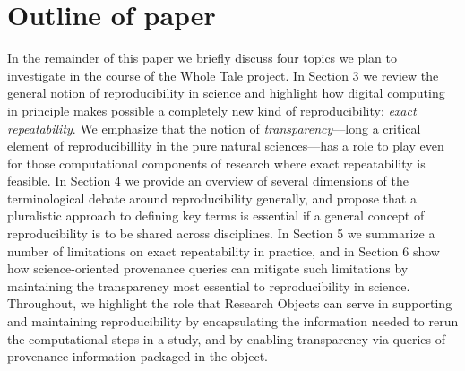 \section{Outline of paper}
In the remainder of this paper we briefly discuss four topics we plan to investigate
	in the course of the Whole Tale project.
In Section 3 we review the general notion of reproducibility in science and highlight how 
	digital computing in principle makes possible a completely new kind of reproducibility: 
	\emph{exact repeatability}. 
We emphasize that the notion of \emph{transparency}---long a critical element of
	reproducibillity in the pure natural sciences---has a role to play even for those computational components
	of research where exact repeatability is feasible.
In Section 4 we provide an overview of several dimensions of the terminological debate around reproducibility
	generally, and propose that a pluralistic approach to defining key terms is essential if a general 
	concept of reproducibility is to be shared across disciplines.
In Section 5 we summarize a number of limitations on exact repeatability in practice, and in Section 6 
	show how science-oriented provenance queries can mitigate such limitations by maintaining
 	the transparency most essential to reproducibility in science.
Throughout, we highlight the role that Research Objects can serve in supporting and maintaining 
	reproducibility by encapsulating the information needed to rerun the computational steps
	in a study, and by enabling transparency via queries of provenance information
	packaged in the object. 
 